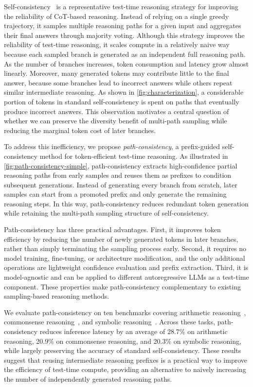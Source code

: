 Self-consistency~\cite{wang2022self} is a representative test-time reasoning strategy for improving the reliability of CoT-based reasoning. Instead of relying on a single greedy trajectory, it samples multiple reasoning paths for a given input and aggregates their final answers through majority voting. Although this strategy improves the reliability of test-time reasoning, it scales compute in a relatively naive way because each sampled branch is generated as an independent full reasoning path. As the number of branches increases, token consumption and latency grow almost linearly. Moreover, many generated tokens may contribute little to the final answer, because some branches lead to incorrect answers while others repeat similar intermediate reasoning. As shown in \cref{fig:characterization}, a considerable portion of tokens in standard self-consistency is spent on paths that eventually produce incorrect answers. This observation motivates a central question of whether we can preserve the diversity benefit of multi-path sampling while reducing the marginal token cost of later branches.

To address this inefficiency, we propose \textit{path-consistency}, a prefix-guided self-consistency method for token-efficient test-time reasoning. As illustrated in \cref{fig:path-consistency-simple}, path-consistency extracts high-confidence partial reasoning paths from early samples and reuses them as prefixes to condition subsequent generations. Instead of generating every branch from scratch, later samples can start from a promoted prefix and only generate the remaining reasoning steps. In this way, path-consistency reduces redundant token generation while retaining the multi-path sampling structure of self-consistency.

Path-consistency has three practical advantages. First, it improves token efficiency by reducing the number of newly generated tokens in later branches, rather than simply terminating the sampling process early. Second, it requires no model training, fine-tuning, or architecture modification, and the only additional operations are lightweight confidence evaluation and prefix extraction. Third, it is model-agnostic and can be applied to different autoregressive LLMs as a test-time component. These properties make path-consistency complementary to existing sampling-based reasoning methods.

We evaluate path-consistency on ten benchmarks covering arithmetic reasoning~\cite{cobbe2021training, patel2021nlp, miao2020diverse, roy2015solving}, commonsense reasoning~\cite{geva2021did}, and symbolic reasoning~\cite{suzgun-etal-2023-challenging}. Across these tasks, path-consistency reduces inference latency by an average of 28.7\% on arithmetic reasoning, 20.9\% on commonsense reasoning, and 20.3\% on symbolic reasoning, while largely preserving the accuracy of standard self-consistency. These results suggest that reusing intermediate reasoning prefixes is a practical way to improve the efficiency of test-time compute, providing an alternative to naively increasing the number of independently generated reasoning paths.